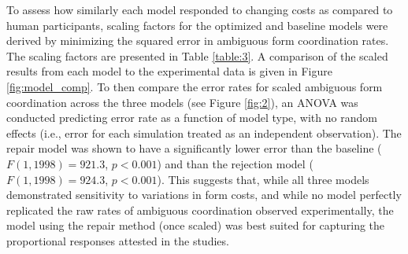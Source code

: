 \documentclass[11pt]{article}
\begin{document}
To assess how similarly each model responded to changing costs as compared to human participants, scaling factors for the optimized and baseline models were derived by minimizing the squared error in ambiguous form coordination rates. The scaling factors are presented in Table \ref{table:3}. A comparison of the scaled results from each model to the experimental data is given in Figure \ref{fig:model_comp}. To then compare the error rates for scaled ambiguous form coordination across the three models (see Figure \ref{fig:2}), an ANOVA was conducted predicting error rate as a function of model type, with no random effects (i.e., error for each simulation treated as an independent observation).  The repair model was shown to have a significantly lower error than the baseline ($F(1, 1998) = 921.3$, $p<0.001$) and than the rejection model ($F(1, 1998) = 924.3$, $p<0.001$). This suggests that, while all three models demonstrated sensitivity to variations in form costs, and while no model perfectly replicated the raw rates of ambiguous coordination observed experimentally, the model using the repair method (once scaled) was best suited for capturing the proportional responses attested in the \citeauthor{rohde2012} studies.


%
\end{document}
